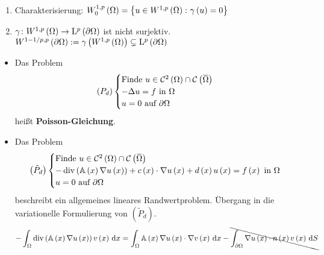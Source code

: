 \begin{lemma}
	\begin{enumerate}
		\item Charakterisierung: $W^{1,p}_{0}\left(\Omega\right) = \left\{u\in W^{1,p}\left(\Omega\right)\colon\gamma\left(u\right)=0\right\}$
		\item $\gamma\colon W^{1,p}\left(\Omega\right)\to\mathrm{L}^{p}\left(\partial\Omega\right)$ ist nicht surjektiv.\\
			$W^{1-1/p,p}\left(\partial\Omega\right) := \gamma\left(W^{1,p}\left(\Omega\right)\right)\subsetneq\mathrm{L}^{p}\left(\partial\Omega\right)$
	\end{enumerate}
\end{lemma}

\begin{expl}
	\begin{itemize}
		\item Das Problem
			\begin{equation*}
				\left(P_{d}\right) \begin{cases}
					\text{Finde }u\in\C^{2}\left(\W\right)\cap\C\left(\overbar{\W}\right)\\
					-\Delta u = f\text{ in }\W\\
					u = 0 \text{ auf }\partial\W
				\end{cases}
			\end{equation*}
			heißt \textbf{Poisson-Gleichung}.
		\item{} Das Problem
			\begin{equation*}
				\left(\tilde{P}_{d}\right) \begin{cases}
					\text{Finde }u\in\C^{2}\left(\W\right)\cap\C\left(\overbar{\W}\right)\\
					-\operatorname{div}\left(\mathbb{A}\left(x\right)\nabla u\left(x\right)\right) + c\left(x\right)\cdot\nabla u\left(x\right) + d\left(x\right)u\left(x\right) = f\left(x\right)\text{ in }\W\\
					u = 0 \text{ auf }\partial\W
				\end{cases}
			\end{equation*}
			beschreibt ein allgemeines lineares Randwertproblem. Übergang in die variationelle Formulierung von $\left(\tilde{P}_{d}\right)$.{}
			\begin{equation*}
				-\int_{\W}\operatorname{div}\left(\mathbb{A}\left(x\right)\nabla u\left(x\right)\right)v\left(x\right)\d x = \int_{\W}\mathbb{A}\left(x\right)\nabla u\left(x\right)\cdot\nabla v\left(x\right)\d x - \bcancel{\int_{\partial\W}\nabla u\left(x\right)\cdot n\left(x\right)v\left(x\right)\d S}

\end{equation*}
\end{itemize}
\end{expl}
